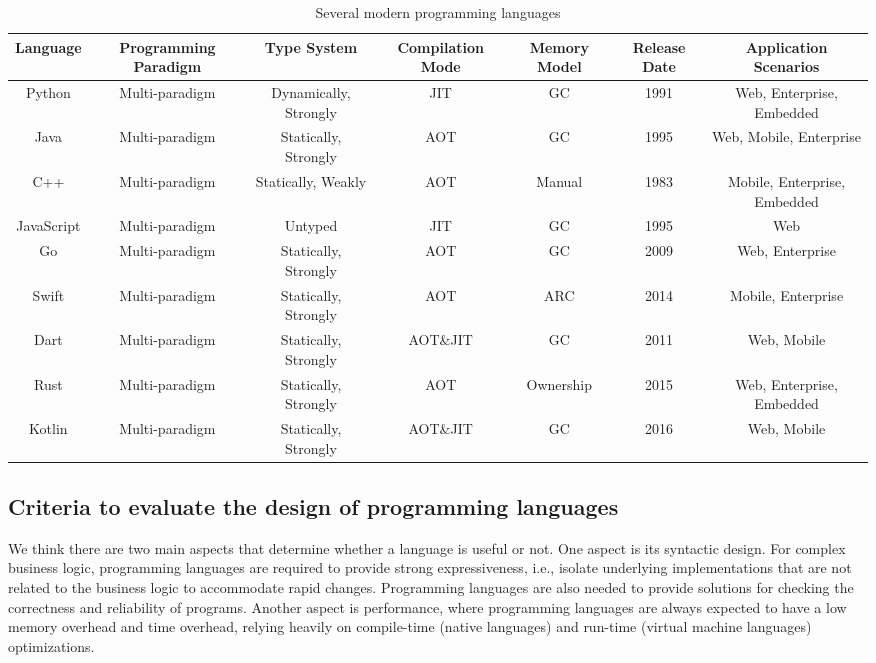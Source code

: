 \begin{table}[hbtp]
    \caption{Several modern programming languages}
    \label{tab:selected-languages}
    \begin{center}
        \begin{tabular}{ccccccc}
            \toprule
            Language & Programming Paradigm & Type System & Compilation Mode & Memory Model &
            Release Date & Application Scenarios \\
            \midrule
            Python & Multi-paradigm & Dynamically, Strongly & JIT & GC & 1991 & Web,
            Enterprise, Embedded \\
            Java & Multi-paradigm & Statically, Strongly & AOT & GC & 1995 & Web,
            Mobile, Enterprise \\
            C++ & Multi-paradigm & Statically, Weakly & AOT & Manual & 1983 & Mobile,
            Enterprise, Embedded \\
            JavaScript & Multi-paradigm & Untyped & JIT & GC & 1995 &
            Web \\
            Go & Multi-paradigm & Statically, Strongly & AOT & GC & 2009 & Web,
            Enterprise \\
            Swift & Multi-paradigm & Statically, Strongly & AOT & ARC & 2014 &
            Mobile, Enterprise \\
            Dart & Multi-paradigm & Statically, Strongly & AOT\&JIT & GC & 2011 &
            Web, Mobile \\
            Rust & Multi-paradigm & Statically, Strongly & AOT & Ownership & 2015 &
            Web, Enterprise, Embedded \\
            Kotlin & Multi-paradigm & Statically, Strongly & AOT\&JIT & GC & 2016 &
            Web, Mobile \\
            \bottomrule
        \end{tabular}
    \end{center}
\end{table}

\subsection{Criteria to evaluate the design of programming languages}

We think there are two main aspects that determine whether a language is useful or not.
One aspect is its syntactic design. For complex business logic, programming languages are required to provide strong expressiveness, i.e., isolate underlying implementations that are not related to the business logic to accommodate rapid changes. Programming languages are also needed to provide solutions for checking the correctness and reliability of programs. Another aspect is performance, where programming languages are always expected to have a low memory overhead and time overhead, relying heavily on compile-time (native languages) and run-time (virtual machine languages) optimizations.

